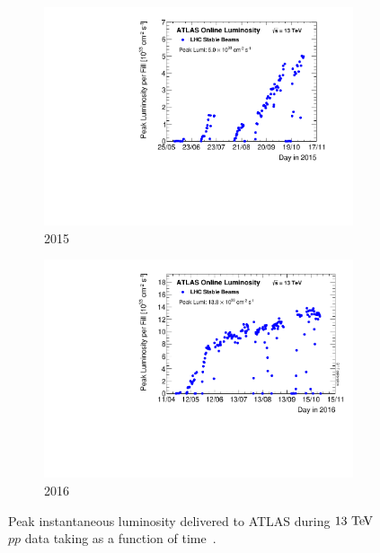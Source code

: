 \begin{figure}[htbp]
  \centering
  \begin{subfigure}[b]{.48\textwidth}
    \includegraphics[width=\textwidth]{figs/detector/peakLumiByFill2015}
    \caption{2015}
  \end{subfigure}
  \begin{subfigure}[b]{.48\textwidth}
    \includegraphics[width=\textwidth]{figs/detector/peakLumiByFill2016}
    \caption{2016}
  \end{subfigure}
  \caption[Peak instantaneous luminosity delivered to ATLAS during $13\tev$ $pp$ data taking as a function of time.]{Peak instantaneous luminosity delivered to ATLAS during $13\tev$ $pp$ data taking as a function of time~\cite{2019.atlas-lumi-plots}.}
  \label{fig:detector_instantaneous_lumi}
\end{figure}

